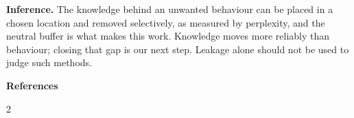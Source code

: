 \documentclass[11pt,a4paper]{article}
\newcommand{\hd}[1]{\textbf{#1}\enspace}
\begin{document}
\hd{Inference.}
The knowledge behind an unwanted behaviour can be placed in a chosen location and removed
selectively, as measured by perplexity, and the neutral buffer is what makes this work. Knowledge moves more reliably than behaviour; closing
that gap is our next step. Leakage alone should not be used to judge such methods.

\hd{References}
{\scriptsize
\renewcommand{\section}[2]{}%
\makeatletter
\renewcommand\@openbib@code{\setlength\itemsep{0pt}\setlength\parsep{0pt}\setlength\topsep{0pt}}%
\makeatother
\setlength{\parskip}{0pt}\linespread{1.0}\selectfont
\setlength{\columnsep}{14pt}\setlength{\multicolsep}{2pt}
\begin{multicols}{2}


\end{multicols}}
\end{document}
